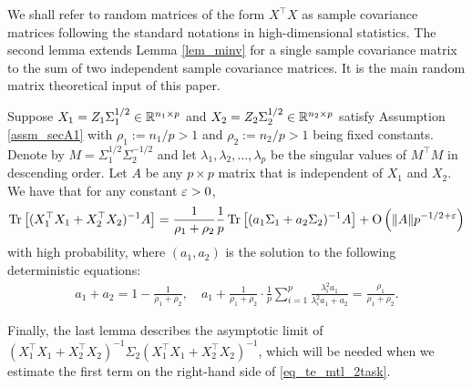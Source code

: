 We shall refer to random matrices of the form $X^\top X$ as sample covariance matrices following the standard notations in high-dimensional statistics. The second lemma extends Lemma \ref{lem_minv} for a single sample covariance matrix to the sum of two independent sample covariance matrices. It is the main random matrix theoretical input of this paper. 

\begin{lemma}\label{lem_cov_shift}
	Suppose $X_1=Z_1\Sigma_1^{1/2}\in \mathbb{R}^{n_1\times p}$ and $X_2=Z_2\Sigma_2^{1/2}\in \mathbb{R}^{n_2\times p}$ satisfy Assumption \ref{assm_secA1} with $\rho_1:=n_1/p>1$ and $\rho_2:=n_2/p>1$ being fixed constants. 
	Denote by $M = \Sigma_1^{1/2}\Sigma_2^{-1/2}$ and let $\lambda_1, \lambda_2, \dots, \lambda_p$ be the singular values of $M^{\top}M$ in descending order. Let $A$ be any $p\times p$ matrix that is independent of $X_1$ and $X_2$. We have that for any constant ${\varepsilon}>0$,
	\begin{align}\label{lem_cov_shift_eq}
		\operatorname{Tr}\left[(X_1^{\top}X_1 + X_2^{\top}X_2)^{-1}A\right] = \frac{1}{\rho_1+\rho_2}\frac1p\operatorname{Tr}\left[ (a_1 \Sigma_1 + a_2\Sigma_2)^{-1} A\right] +\operatorname{O}\left(\|A\| p^{-1/2+\varepsilon}\right)
	\end{align}
with high probability, where $(a_1, a_2)$ is the solution to the following deterministic equations:
	\begin{align}
		a_1 + a_2 = 1- \frac{1}{\rho_1 + \rho_2},\quad a_1 + \frac1{\rho_1 + \rho_2}\cdot \frac{1}{p}\sum_{i=1}^p \frac{\lambda_i^2 a_1}{\lambda_i^2 a_1 + a_2} = \frac{\rho_1}{\rho_1 + \rho_2}. \label{eq_a12extra}
	\end{align}
\end{lemma}

Finally, the last lemma describes the asymptotic limit of $(X_1^{\top}X_1 + X_2^{\top}X_2)^{-1}\Sigma_2(X_1^{\top}X_1 + X_2^{\top}X_2)^{-1}$, which will be needed when we estimate the first term on the right-hand side of \eqref{eq_te_mtl_2task}.

